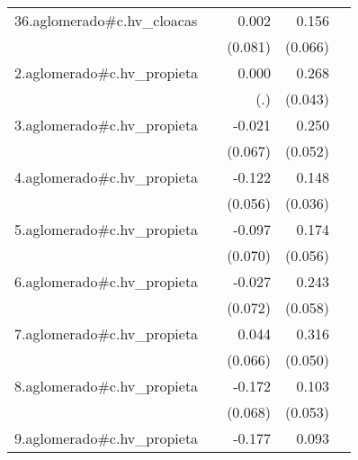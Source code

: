 {\begin{longtable}{l*{4}{D{.}{.}{-1}}}
\addlinespace
36.aglomerado#c.hv\_cloacas&                     &       0.002         &       0.156\sym{*}  &                     \\
            &                     &     (0.081)         &     (0.066)         &                     \\
\addlinespace
2.aglomerado#c.hv\_propieta&                     &       0.000         &       0.268\sym{***}&                     \\
            &                     &         (.)         &     (0.043)         &                     \\
\addlinespace
3.aglomerado#c.hv\_propieta&                     &      -0.021         &       0.250\sym{***}&                     \\
            &                     &     (0.067)         &     (0.052)         &                     \\
\addlinespace
4.aglomerado#c.hv\_propieta&                     &      -0.122\sym{*}  &       0.148\sym{***}&                     \\
            &                     &     (0.056)         &     (0.036)         &                     \\
\addlinespace
5.aglomerado#c.hv\_propieta&                     &      -0.097         &       0.174\sym{**} &                     \\
            &                     &     (0.070)         &     (0.056)         &                     \\
\addlinespace
6.aglomerado#c.hv\_propieta&                     &      -0.027         &       0.243\sym{***}&                     \\
            &                     &     (0.072)         &     (0.058)         &                     \\
\addlinespace
7.aglomerado#c.hv\_propieta&                     &       0.044         &       0.316\sym{***}&                     \\
            &                     &     (0.066)         &     (0.050)         &                     \\
\addlinespace
8.aglomerado#c.hv\_propieta&                     &      -0.172\sym{*}  &       0.103         &                     \\
            &                     &     (0.068)         &     (0.053)         &                     \\
\addlinespace
9.aglomerado#c.hv\_propieta&                     &      -0.177\sym{*}  &       0.093         &                     \\

\end{longtable}}
